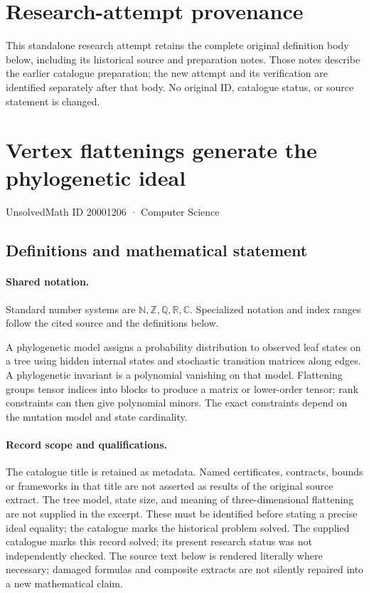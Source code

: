 \documentclass[11pt]{article}
\begin{document}
\section*{Research-attempt provenance}
This standalone research attempt retains the complete original definition body below,
including its historical source and preparation notes. Those notes describe the
earlier catalogue preparation; the new attempt and its verification are identified
separately after that body. No original ID, catalogue status, or source statement is changed.

\section{Vertex flattenings generate the phylogenetic ideal}\label{20001206}
{\small UnsolvedMath ID 20001206 · Computer Science}
\subsection{Definitions and mathematical statement}

\paragraph{Shared notation.}Standard number systems are $\mathbb N,\mathbb Z,\mathbb Q,\mathbb R,\mathbb C$. Specialized notation and index ranges follow the cited source and the definitions below.


A phylogenetic model assigns a probability distribution to observed leaf states on a tree using hidden internal states and stochastic transition matrices along edges. A phylogenetic invariant is a polynomial vanishing on that model. Flattening groups tensor indices into blocks to produce a matrix or lower-order tensor; rank constraints can then give polynomial minors. The exact constraints depend on the mutation model and state cardinality.
\paragraph{Record scope and qualifications.}
The catalogue title is retained as metadata. Named certificates, contracts, bounds or frameworks in that title are not asserted as results of the original source extract.
The tree model, state size, and meaning of three-dimensional flattening are not supplied in the excerpt. These must be identified before stating a precise ideal equality; the catalogue marks the historical problem solved. The supplied catalogue marks this record solved; its present research status was not independently checked.
The source text below is rendered literally where necessary; damaged formulas and composite extracts are not silently repaired into a new mathematical claim.
\end{document}

